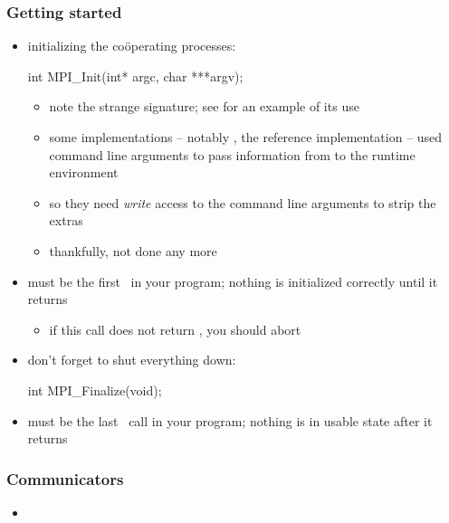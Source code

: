 \begin{frame}[fragile]
%
  \frametitle{Getting started}
%
  \begin{itemize}
%
%
  \item initializing the co\"operating processes:
    \begin{C}
int MPI_Init(int* argc, char ***argv);
    \end{C}
    \begin{itemize}
    \item note the strange signature; see  for an example of its use
    \item some implementations -- notably , the reference implementation --
      used command line arguments to pass information from  to the runtime
      environment
    \item so they need {\em write} access to the command line arguments to strip the extras
    \item thankfully, not done any more
    \end{itemize}
%
  \item must be the first \mpi\ in your program; nothing is initialized correctly until it
    returns
    \begin{itemize}
    \item if this call does not return , you should abort
    \end{itemize}
% 
  \item don't forget to shut everything down:
    \begin{C}
int MPI_Finalize(void);
    \end{C}
%
  \item must be the last \mpi\ call in your program; nothing is in usable state after it
    returns
%
  \end{itemize}
%
\end{frame}

\begin{frame}[fragile]
%
  \frametitle{Communicators}
%
  \begin{itemize}
%
  \item 
%
  \end{itemize}
%
\end{frame}

